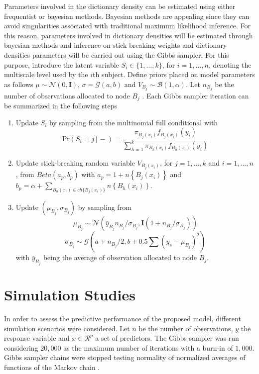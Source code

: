 \documentclass{article}
\providecommand{\mb}[1]{\boldsymbol{#1}}
\providecommand{\mc}[1]{\mathcal{#1}}
\begin{document}
Parameters involved in the dictionary density can be estimated using either frequentist or bayesian methods. Bayesian methods are appealing since they can avoid singularities associated with traditional maximum likelihood inference. For this reason, parameters involved in dictionary densities will be estimated through bayesian methods and inference on stick breaking weights and dictionary densities parameters will be carried out using the Gibbs sampler. For this purpose, introduce the latent variable $S_i \in \{1,\ldots,k\}$, for $i=1,\ldots,n$, denoting the multiscale level used by the $i$th subject. Define priors placed on model parameters as follows $\mu \sim \mc{N}(0,\mb{I})$, $\sigma=\mc{G}(a,b)$ and $V_{B_j} \sim \mc{B}(1,\alpha)$. Let $n_{B_j}$ be  the number of observations allocated to node $B_j$ . Each Gibbs sampler iteration can be summarized in the following steps
\begin{enumerate}
\item Update $S_i$ by sampling from the multinomial full conditional with 
\[\mbox{Pr}( S_i = j\, |\, -) = \frac{ \pi_{B_j(x_i)}f_{B_j(x_i)}(y_i) }{ \sum_{h=1}^k \pi_{B_h(x_i)}f_{B_h(x_i)}(y_i) } \label{eq:prS}\]
\item Update stick-breaking random variable $V_{B_j(x_i)}$, for $j=1, \ldots, k$ and $i=1, \ldots, n$, from $Beta(a_p,b_p)$ with $a_p=1+n\left\{B_j(x_i)\right\}$ and $b_p=\alpha+\sum_{B_h(x_i) \in ch\{B_j(x_i)\}} n\left\{B_h(x_i)\right\}$.
\item Update $(\mu_{B_j},\sigma_{B_j})$ by sampling from
\[  \mu_{B_j} \sim \mc{N}\left(\bar{y}_{B_j} n_{B_j}/\sigma_{B_j},\mb{I}(1+n_{B_j}/\sigma_{B_j})\right)\]
\[  \sigma_{B_j} \sim \mc{G}\left(a+n_{B_j}/2,b+0.5\sum \left(y_{s}-\mu_{B_j}\right)^2\right)\]
with $\bar{y}_{B_j}$ being the average of observation allocated to node $B_j$.

\end{enumerate}



\section{Simulation Studies}
In order to assess the predictive performance of the proposed model, different simulation scenarios were considered. Let $n$ be the number of observations, $y$ the response variable and $x \in \mathcal{R}^p$ a set of predictors. The Gibbs sampler was run considering $20,000$ as the maximum number of iterations with a burn-in of $1,000$. Gibbs sampler chains were stopped testing normality of normalized averages of functions of the Markov chain \cite{Chauveau98anautomated}. 
\end{document}
